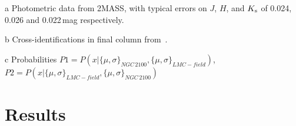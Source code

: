 \begin{table}
\begin{center}
\begin{threeparttable}
\begin{tabular}{lrccccccl }
\hline
\end{tabular}
\begin{tablenotes}
\item [a] Photometric data from 2MASS, with typical errors on $J$, $H$, and $K_{\rm s}$ of 0.024, 0.026 and 0.022\,mag respectively.
\item [b] Cross-identifications in final column from~\cite{1974A&AS...15..261R}.
\item [c] Probabilities $P1=P(x|\{\mu, \sigma\}_{NGC\,2100}, \{\mu, \sigma\}_{LMC-field})$,\\
                        $P2=P(x|\{\mu, \sigma\}_{LMC-field}, \{\mu, \sigma\}_{NGC\,2100})$
\end{tablenotes}
\end{threeparttable}
\end{center}
\end{table}


\section{Results} %
\label{sec:ngc2100results}


